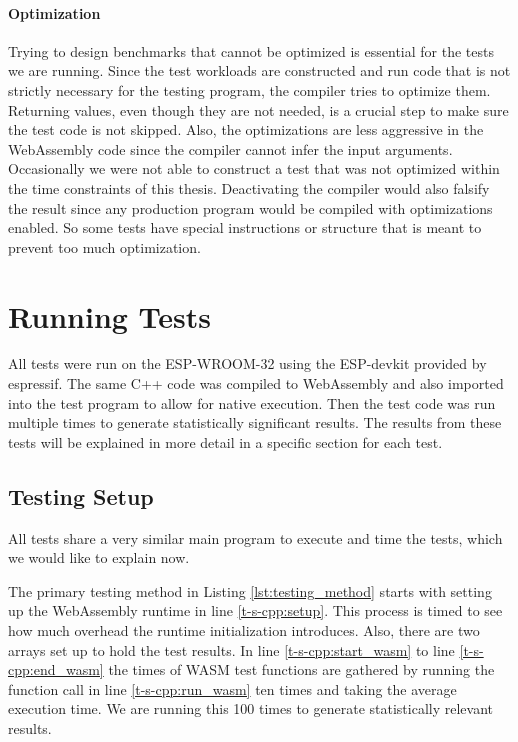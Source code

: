 \paragraph{Optimization}\label{par:optimization}

Trying to design benchmarks that cannot be optimized is essential for the tests we are running. Since the test workloads are constructed and run code that is not strictly necessary for the testing program, the compiler tries to optimize them. Returning values, even though they are not needed, is a crucial step to make sure the test code is not skipped. Also, the optimizations are less aggressive in the WebAssembly code since the compiler cannot infer the input arguments. Occasionally we were not able to construct a test that was not optimized within the time constraints of this thesis.
Deactivating the compiler would also falsify the result since any production program would be compiled with optimizations enabled. So some tests have special instructions or structure that is meant to prevent too much optimization.

\section{Running Tests}

All tests were run on the ESP-WROOM-32 using the ESP-devkit provided by espressif. The same C++ code was compiled to WebAssembly and also imported into the test program to allow for native execution. Then the test code was run multiple times to generate statistically significant results. The results from these tests will be explained in more detail in a specific section for each test.

\subsection{Testing Setup}\label{subsec:testing_setup}

All tests share a very similar main program to execute and time the tests, which we would like to explain now.



The primary testing method in Listing \ref{lst:testing_method} starts with setting up the WebAssembly runtime in line \ref{t-s-cpp:setup}. This process is timed to see how much overhead the runtime initialization introduces. Also, there are two arrays set up to hold the test results. In line \ref{t-s-cpp:start_wasm} to line \ref{t-s-cpp:end_wasm} the times of WASM test functions are gathered by running the function call in line \ref{t-s-cpp:run_wasm} ten times and taking the average execution time. We are running this 100 times to generate statistically relevant results.

